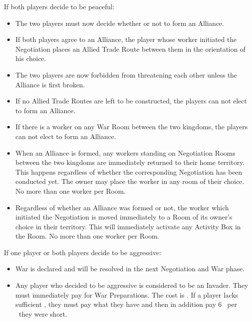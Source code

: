 \documentclass[10pt,twocolumn]{article}
\begin{document}
{\noindent If both players decide to be peaceful:}
\begin{itemize}
\item The two players must now decide whether or not to form an Alliance.
\item If both players agree to an Alliance, the player whose worker initiated the Negotiation places an Allied Trade Route between them in the orientation of his choice.
\item The two players are now forbidden from threatening each other unless the Alliance is first broken.
\item If no Allied Trade Routes are left to be constructed, the players can not elect to form an Alliance.
\item If there is a worker on any War Room between the two kingdoms, the players can not elect to form an Alliance.
\item When an Alliance is formed, any workers standing on Negotiation Rooms between the two kingdoms are immediately returned to their home territory. This happens regardless of whether the corresponding Negotiation has been conducted yet. The owner may place the worker in any room of their choice. No more than one worker per Room. 
\item Regardless of whether an Alliance was formed or not, the worker which initiated the Negotiation is moved immediately to a Room of its owner's choice in their territory. This will immediately activate any Activity Box in the Room. No more than one worker per Room.
\end{itemize}

{\noindent If one player or both players decide to be aggressive:}
\begin{itemize}
\item War is declared and will be resolved in the next Negotiation and War phase.
\item Any player who decided to be aggressive is considered to be an Invader. They must immediately pay for War Preparations. The cost is  \minerals. If a player lacks sufficient \goods, they must pay what they have and then in addition pay 6 \vps\ per \mineral\ they were short.
\iftoggle{original-rules}{
\item A player who decided to be peaceful is considered to be a Defender. They are not required to pay any War Preparation, but will also receive fewer \vps\ in the event of victory.
}{
\item A player who decided to be peaceful is considered to be a Defender. They are not required to pay any War Preparation, but will also receive less \vps\ in the event of victory.
}
\end{itemize}
\end{document}
